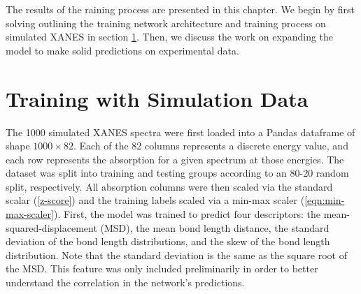 The results of the raining process are presented in this chapter. We begin by first solving outlining the training network architecture and training process on simulated XANES in section \ref{sec:nn-sim-data}. Then, we discuss the work on expanding the model to make solid predictions on experimental data.

\section{Training with Simulation Data} \label{sec:nn-sim-data}
The 1000 simulated XANES spectra were first loaded into a Pandas dataframe \cite{pandas-1} \cite{pandas-2} of shape $ 1000\times82 $. Each of the 82 columns represents a discrete energy value, and each row represents the absorption for a given spectrum at those energies. The dataset was split into training and testing groups according to an 80-20 random split, respectively. All absorption columns were then scaled via the standard scalar (\ref{z-score}) and the training labels scaled via a min-max scaler (\ref{eqn:min-max-scaler}). First, the model was trained to predict four descriptors: the mean-squared-displacement (MSD), the mean bond length distance, the standard deviation of the bond length distributions, and the skew of the bond length distribution. Note that the standard deviation is the same as the square root of the MSD. This feature was only included preliminarily in order to better understand the correlation in the network's predictions. 

